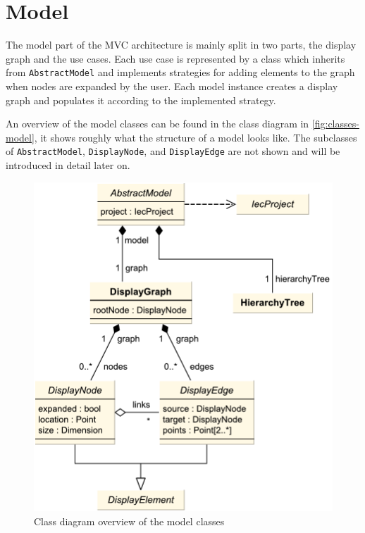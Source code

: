 \section{Model}

The model part of the MVC architecture is mainly split in two parts, the display graph and the use cases. Each use case 
is represented by a class which inherits from \lstinline|AbstractModel| and implements strategies for adding elements 
to the graph when nodes are expanded by the user. Each model instance creates a display graph and populates it 
according to the implemented strategy.

An overview of the model classes can be found in the class diagram in \autoref{fig:classes-model}, it shows roughly 
what the structure of a model looks like. The subclasses of \lstinline|AbstractModel|, \lstinline|DisplayNode|, and 
\lstinline|DisplayEdge| are not shown and will be introduced in detail later on.

\begin{figure}[htb]
  \centering
    \includegraphics[scale=0.6]{bilder/classes-model}
  \caption{Class diagram overview of the model classes}
  \label{fig:classes-model}
\end{figure}

